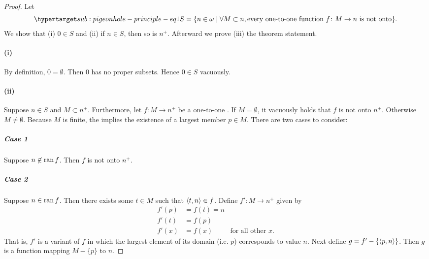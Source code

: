 \documentclass{report}
\begin{document}
  \begin{proof}

    Let
      \begin{equation}
        \hyperlabel{sub:pigeonhole-principle-eq1}
        S = \{n \in \omega \mid
          \forall M \subset n, \text{every one-to-one function }
            f \colon M \rightarrow n \text{ is not onto}\}.
      \end{equation}
    We show that (i) $0 \in S$ and (ii) if $n \in S$, then so is $n^+$.
    Afterward we prove (iii) the theorem statement.

    \paragraph{(i)}%

      By definition, $0 = \emptyset$.
      Then $0$ has no proper subsets.
      Hence $0 \in S$ vacuously.

    \paragraph{(ii)}%

      Suppose $n \in S$ and $M \subset n^+$.
      Furthermore, let $f \colon M \rightarrow n^+$ be a one-to-one
        .
      If $M = \emptyset$, it vacuously holds that $f$ is not onto $n^+$.
      Otherwise $M \neq \emptyset$.
      Because $M$ is finite, the 
        implies the existence of a largest member $p \in M$.
      There are two cases to consider:

      \subparagraph{Case 1}%

        Suppose $n \not\in \mathop{\text{ran}}{f}$.
        Then $f$ is not onto $n^+$.

      \subparagraph{Case 2}%

        Suppose $n \in \mathop{\text{ran}}{f}$.
        Then there exists some $t \in M$ such that $\left< t, n \right> \in f$.
        Define $f' \colon M \rightarrow n^+$ given by
          \begin{align*}
            f'(p) & = f(t) = n \\
            f'(t) & = f(p) \\
            f'(x) & = f(x) & \text{for all other } x.
          \end{align*}
        That is, $f'$ is a variant of $f$ in which the largest element of its
          domain (i.e. $p$) corresponds to value $n$.
        Next define $g = f' - \{\left< p, n \right>\}$.
        Then $g$ is a function mapping $M - \{p\}$ to $n$.


\end{proof}
\end{document}
